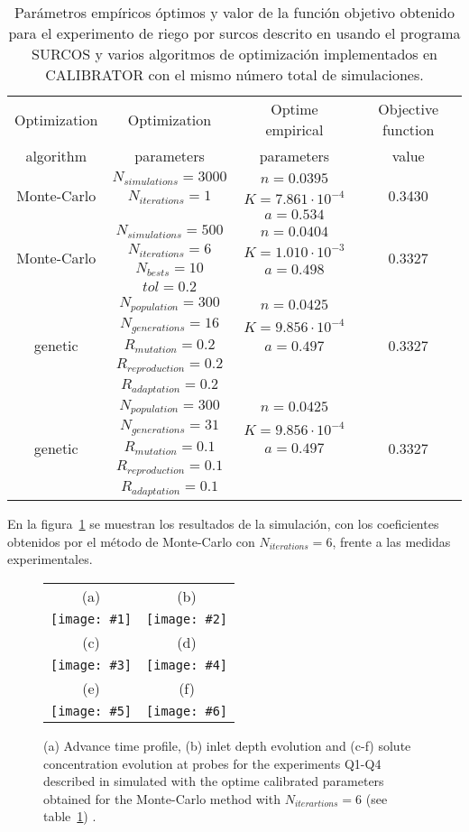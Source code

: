 \documentclass[review,authoryear]{elsarticle}
\newcommand{\TABLE}[5]
{
	\begin{table}[ht!]
		\centering
		\caption{#4.\label{#5}}
		#1
		\begin{tabular}{#2}
			#3
		\end{tabular}
	\end{table}
}
\newcommand{\FIGVI}[8]
{
	\begin{figure}[ht!]
		\centering
		\begin{tabular}{cc}
			(a) & (b)
			\\ \texttt{[image: \#1]} & \texttt{[image: \#2]}
			\\ (c) & (d)
			\\ \texttt{[image: \#3]} & \texttt{[image: \#4]}
			\\ (e) & (f)
			\\ \texttt{[image: \#5]} & \texttt{[image: \#6]}
		\end{tabular}
		\caption{#7.\label{#8}}
	\end{figure}
}
\begin{document}
\TABLE{\scriptsize}{cccc}
{
	Optimization & Optimization & Optime empirical & Objective function
	\\ algorithm & parameters & parameters & value
	\\ \hline
	\multirow{3}{*}{Monte-Carlo} & $N_{simulations}=3000$
	& $n=0.0395$
	& \multirow{3}{*}{0.3430} \\
	& $N_{iterations}=1$ & $K=7.861\cdot 10^{-4}$
	\\ & & $a=0.534$
	\\ \hline
	\multirow{4}{*}{Monte-Carlo} & $N_{simulations}=500$
	& $n=0.0404$
	& \multirow{4}{*}{0.3327} \\
	& $N_{iterations}=6$ & $K=1.010\cdot 10^{-3}$
	\\ & $N_{bests}=10$ & $a=0.498$
	\\ & $tol=0.2$
	\\ \hline
	\multirow{5}{*}{genetic} & $N_{population}=300$
	& $n=0.0425$
	& \multirow{5}{*}{0.3327}
	\\ & $N_{generations}=16$ & $K=9.856\cdot 10^{-4}$
	\\ & $R_{mutation}=0.2$ & $a=0.497$
	\\ & $R_{reproduction}=0.2$
	\\ & $R_{adaptation}=0.2$
	\\ \hline
	\multirow{5}{*}{genetic} & $N_{population}=300$
	& $n=0.0425$
	& \multirow{5}{*}{0.3327}
	\\ & $N_{generations}=31$ & $K=9.856\cdot 10^{-4}$
	\\ & $R_{mutation}=0.1$ & $a=0.497$
	\\ & $R_{reproduction}=0.1$
	\\ & $R_{adaptation}=0.1$
	\\ \hline
}{Parámetros empíricos óptimos y valor de la función objetivo obtenido para el
experimento de riego por surcos descrito en \citet{JaviSurcos2} usando el
programa SURCOS y varios algoritmos de optimización implementados en CALIBRATOR
con el mismo número total de simulaciones}{TabSurcos}

En la figura~\ref{FigSurcos} se muestran los resultados de la simulación, con
los coeficientes obtenidos por el método de Monte-Carlo con $N_{iterations}=6$,
frente a las medidas experimentales.

\FIGVI{surcos-advance.eps}{surcos-depth.eps}{surcos-solute-q1.eps}
{surcos-solute-q2.eps}{surcos-solute-q3.eps}{surcos-solute-q4.eps}
{
	(a) Advance time profile, (b) inlet depth evolution and (c-f) solute
	concentration evolution at probes for the experiments Q1-Q4 described in
	\citet{JaviSurcos2} simulated with the optime calibrated parameters obtained
	for the Monte-Carlo method with $N_{iterartions}=6$ (see
	table~\ref{TabSurcos})
}{FigSurcos}
\end{document}
